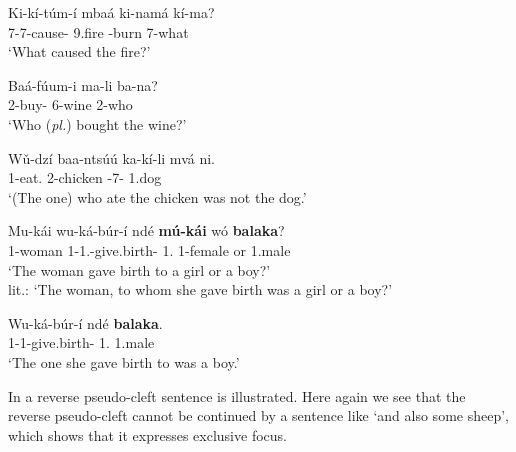 \documentclass[output=paper,colorlinks,citecolor=brown,
]{langscibook}
\begin{document}
\begin{exe}
    \ex \label{139}
    \begin{xlist}
\ex
\label{139a}
\gll
Ki-kí-túm-í mbaá ki-namá kí-ma?\\
7\Rel{}-7\Sm{}-cause-\Pst{} 9.fire \Inf{}-burn 7-what\\
\trans ‘What caused the fire?’

\ex
\label{139b}
\gll
Baá-fúum-i ma-li ba-na?\\
2\Rel{}-buy-\Pst{} 6-wine 2-who\\
\trans ‘Who (\textit{pl.}) bought the wine?’

\ex
\label{139c}
\gll
Wǔ-dzí baa-ntsúú ka-kí-li mvá ni.\\
1\Rel{}-eat.\Pst{} 2-chicken \Neg{}-7\Sm{}-\Cop{} 1.dog \Neg{}\\
\trans ‘(The one) who ate the chicken was not the dog.’

    \end{xlist}
\end{exe}
\begin{exe}
    \ex \label{140}
    \begin{xlist}
\ex
\label{140a}
\gll
Mu-kái wu-ká-búr-í ndé \textbf{mú-kái} wó \textbf{balaka}?\\
1-woman 1\Rel{}-1\Sm{}.\Pst{}-give.birth-\Pst{} 1.\Pro{} 1-female or 1.male\\
\trans ‘The woman gave birth to a girl or a boy?’\\lit.: `The woman, to whom she gave birth was a girl or a boy?'

\ex
\label{140b}
\gll
Wu-ká-búr-í ndé \textbf{balaka}.\\
1\Rel{}-1\Sm{}-give.birth-\Pst{} 1.\Pro{} 1.male\\
\trans ‘The one she gave birth to was a boy.’

    \end{xlist}
\end{exe}
In  a reverse pseudo-cleft sentence is illustrated. Here again we see that the reverse pseudo-cleft cannot be continued by a sentence like `and also some sheep', which shows that it expresses exclusive focus. 
\end{document}
